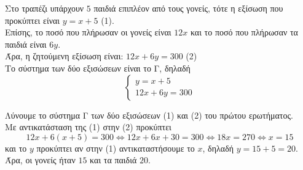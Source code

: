 \begin{alist}
\item Στο τραπέζι υπάρχουν $5$ παιδιά επιπλέον από τους γονείς, τότε η εξίσωση που προκύπτει είναι $y = x + 5$ (1). \\
Επίσης, το ποσό που πλήρωσαν οι γονείς είναι $12x$ και το ποσό που πλήρωσαν τα παιδιά είναι $6y$. \\
Άρα, η ζητούμενη εξίσωση είναι: $12x + 6y = 300$ (2) \\
Το σύστημα των δύο εξισώσεων είναι το Γ, δηλαδή 
\[\begin{cases} y = x + 5 \\ 12x + 6y = 300 \end{cases}\]
\item Λύνουμε το σύστημα Γ των δύο εξισώσεων (1) και (2) του πρώτου ερωτήματος. \\
Με αντικατάσταση της (1) στην (2) προκύπτει
\[12x + 6(x + 5) = 300 \Leftrightarrow 12x + 6x + 30 = 300 \Leftrightarrow 18x = 270 \Leftrightarrow x = 15\]
και το $y$ προκύπτει αν στην (1) αντικαταστήσουμε το $x$, δηλαδή $y = 15 + 5 = 20$. \\
Άρα, οι γονείς ήταν $15$ και τα παιδιά $20$.
\end{alist}

